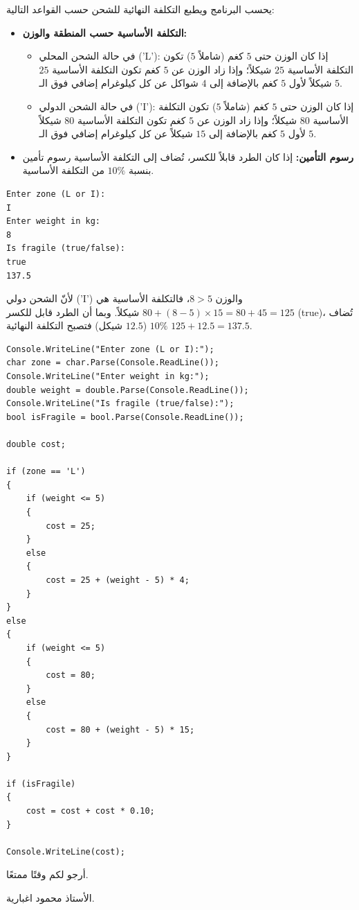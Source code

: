 \documentclass[14pt]{extarticle}
\begin{document}
\begin{enumerate}[resume, itemsep=2.2em]
يحسب البرنامج ويطبع التكلفة النهائية للشحن حسب القواعد التالية:
\begin{itemize}
    \item \textbf{التكلفة الأساسية حسب المنطقة والوزن:}
    \begin{itemize}[nosep]
        \item في حالة الشحن المحلي (\textenglish{'L'}): إذا كان الوزن حتى $5$ كغم (شاملاً $5$) تكون التكلفة الأساسية $25$ شيكلاً؛ وإذا زاد الوزن عن $5$ كغم تكون التكلفة الأساسية $25$ شيكلاً لأول $5$ كغم بالإضافة إلى $4$ شواكل عن كل كيلوغرام إضافي فوق الـ $5$.
        \item في حالة الشحن الدولي (\textenglish{'I'}): إذا كان الوزن حتى $5$ كغم (شاملاً $5$) تكون التكلفة الأساسية $80$ شيكلاً؛ وإذا زاد الوزن عن $5$ كغم تكون التكلفة الأساسية $80$ شيكلاً لأول $5$ كغم بالإضافة إلى $15$ شيكلاً عن كل كيلوغرام إضافي فوق الـ $5$.
    \end{itemize}
    \item \textbf{رسوم التأمين:} إذا كان الطرد قابلاً للكسر، تُضاف إلى التكلفة الأساسية رسوم تأمين بنسبة $10\%$ من التكلفة الأساسية.
\end{itemize}

\ifdetailed
\begin{boxExample}
\begin{english}
\begin{verbatim}
Enter zone (L or I):
I
Enter weight in kg:
8
Is fragile (true/false):
true
137.5
\end{verbatim}
\end{english}
\end{boxExample}
لأنّ الشحن دولي (\textenglish{'I'}) والوزن $8 > 5$، فالتكلفة الأساسية هي $80 + (8 - 5) \times 15 = 80 + 45 = 125$ شيكلاً. وبما أن الطرد قابل للكسر (\textenglish{true})، تُضاف $10\%$ ($12.5$ شيكل) فتصبح التكلفة النهائية $125 + 12.5 = 137.5$.
\fi

\ifwithsols
\begin{boxSolution}
\begin{english}
\begin{verbatim}
Console.WriteLine("Enter zone (L or I):");
char zone = char.Parse(Console.ReadLine());
Console.WriteLine("Enter weight in kg:");
double weight = double.Parse(Console.ReadLine());
Console.WriteLine("Is fragile (true/false):");
bool isFragile = bool.Parse(Console.ReadLine());

double cost;

if (zone == 'L')
{
    if (weight <= 5)
    {
        cost = 25;
    }
    else
    {
        cost = 25 + (weight - 5) * 4;
    }
}
else
{
    if (weight <= 5)
    {
        cost = 80;
    }
    else
    {
        cost = 80 + (weight - 5) * 15;
    }
}

if (isFragile)
{
    cost = cost + cost * 0.10;
}

Console.WriteLine(cost);
\end{verbatim}
\end{english}
\end{boxSolution}
\fi
\filbreak

\end{enumerate}

\vspace{1cm}
\begin{flushleft}
أرجو لكم وقتًا ممتعًا.

الأستاذ محمود اغبارية.
\end{flushleft}
\end{document}
